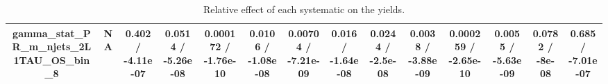 \documentclass[10pt]{article}
\begin{document}
\begin{table}[htbp]
\begin{center}
\begin{tabular}{|c|c|c|c|c|c|c|c|c|c|c|c|c|c|}
  gamma_stat_PR_m_njets_2L1TAU_OS_bin_8 &    NA    & 0.402 / -4.11e-07 & 0.0514 / -5.26e-08 & 0.000172 / -1.76e-10 & 0.0106 / -1.08e-08 & 0.00704 / -7.21e-09 & 0.016 / -1.64e-08 & 0.0244 / -2.5e-08 & 0.0038 / -3.88e-09 & 0.000259 / -2.65e-10 & 0.0055 / -5.63e-09 & 0.0782 / -8e-08 & 0.685 / -7.01e-07 \\ 
\hline 
\end{tabular} 
\caption{Relative effect of each systematic on the yields.} 
\end{center} 
\end{table} 
\end{document}
